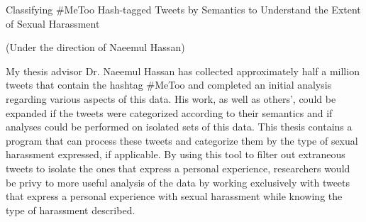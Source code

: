 \centerline{Classifying \#MeToo Hash-tagged Tweets by Semantics to Understand the Extent of Sexual Harassment}
\centerline{(Under the direction of Naeemul Hassan)}
\hfill \break

My thesis advisor Dr. Naeemul Hassan has collected approximately half a million tweets that contain the hashtag \#MeToo and completed an initial analysis regarding various aspects of this data. His work, as well as others', could be expanded if the tweets were categorized according to their semantics and if analyses could be performed on isolated sets of this data. This thesis contains a program that can process these tweets and categorize them by the type of sexual harassment expressed, if applicable. By using this tool to filter out extraneous tweets to isolate the ones that express a personal experience, researchers would be privy to more useful analysis of the data by working exclusively with tweets that express a personal experience with sexual harassment while knowing the type of harassment described.
